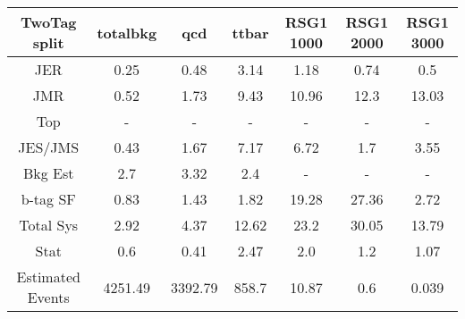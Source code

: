 \begin{footnotesize} 
\begin{tabular}{c|c|c|c|c|c|c} 
TwoTag split & totalbkg & qcd & ttbar & RSG1 1000 & RSG1 2000 & RSG1 3000 \\ 
\hline\hline 
JER & 0.25 & 0.48 & 3.14 & 1.18 & 0.74 & 0.5\\ 
JMR & 0.52 & 1.73 & 9.43 & 10.96 & 12.3 & 13.03\\ 
Top &  -  &  -  &  -  &  -  &  -  &  - \\ 
JES/JMS & 0.43 & 1.67 & 7.17 & 6.72 & 1.7 & 3.55\\ 
Bkg Est & 2.7 & 3.32 & 2.4 &  -  &  -  &  - \\ 
b-tag SF & 0.83 & 1.43 & 1.82 & 19.28 & 27.36 & 2.72\\ 
\hline 
Total Sys & 2.92 & 4.37 & 12.62 & 23.2 & 30.05 & 13.79\\ 
\hline 
Stat & 0.6 & 0.41 & 2.47 & 2.0 & 1.2 & 1.07\\ 
\hline 
Estimated Events & 4251.49 & 3392.79 & 858.7 & 10.87 & 0.6 & 0.039\\ 
\hline\hline 
\end{tabular} 
\end{footnotesize} 
\newline 
